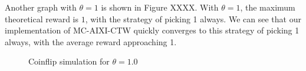 \documentclass[pdftex,twoside,a4paper]{report}
\newcommand{\mac}{MC-AIXI-CTW}
\begin{document}
Another graph with $\theta = 1$ is shown in Figure XXXX. With $\theta = 1$, the maximum theoretical reward is $1$, with the strategy of picking 1 always. We can see that our implementation of \mac{} quickly converges to this strategy of picking 1 always, with the average reward approaching 1.
\begin{figure}
\centering
\caption{Coinflip simulation for $\theta=1.0$}
\label{fig:coin_1_0}
\end{figure}
\end{document}
